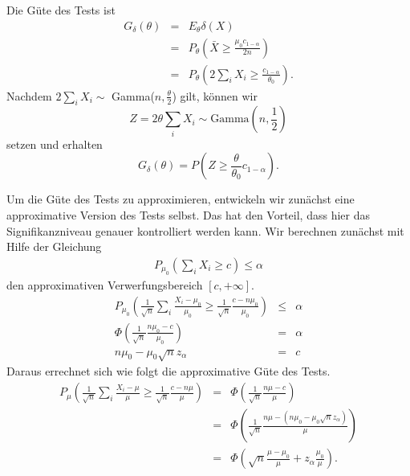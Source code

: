 Die Güte des Tests ist
\begin{eqnarray*}
    G_\delta (\theta) &=&  E_\theta \delta(X) \\
    &=& P_\theta \left( \bar X  \geq \frac{\mu_0 c_{1-\alpha}}{2n} \right) \\
    &=& P_\theta \left( 2 \sum_{i}^{} X_i \geq \frac{c_{1-\alpha}}{\theta_0} \right).
\end{eqnarray*}
Nachdem $2 \sum_{i} X_i \sim $ Gamma($n, \frac{\theta}{2}$) gilt, können wir 
\begin{equation*}
    Z = 2 \theta \sum_{i}^{} X_i \sim \textrm{Gamma}(n,\frac{1}{2})
\end{equation*}
setzen und erhalten
\begin{equation*}
    G_\delta(\theta) = P \left( Z \geq \frac{\theta}{\theta_0} c_{1-\alpha} \right).
\end{equation*}

Um die Güte des Tests zu approximieren, entwickeln wir zunächst eine approximative 
Version des Tests selbst. Das hat den Vorteil, dass hier das Signifikanzniveau 
genauer kontrolliert werden kann. Wir berechnen zunächst mit Hilfe der Gleichung
\begin{eqnarray*}
    P_{\mu_0} \left( \sum_{i}^{} X_i \geq c \right) \leq \alpha
\end{eqnarray*}
den approximativen Verwerfungsbereich $\left[ c,+\infty \right]$.
\begin{eqnarray*}
    P_{\mu_0} \left( \frac{1}{\sqrt{n}} \sum_{i}^{} \frac{X_i - \mu_0}{\mu_0} \geq \frac{1}{\sqrt{n}} 
    \frac{c -n\mu_0}{ \mu_0}\right) &\leq& \alpha \\
    \Phi \left( \frac{1}{\sqrt{n} } \frac{n \mu_0 - c}{\mu_0}  \right) &=&  \alpha \\
    n \mu_0 - \mu_0 \sqrt{n} z_\alpha &=&  c
\end{eqnarray*}
Daraus errechnet sich wie folgt die approximative Güte des Tests.
\begin{eqnarray*}
    P_\mu \left( \frac{1}{\sqrt{n}} \sum_{i}^{} \frac{X_i - \mu}{\mu} \geq \frac{1}{\sqrt{n}} \frac{c-n \mu}{ \mu}   \right) &=&  \Phi \left( \frac{1}{\sqrt{n}} \frac{n \mu - c}{ \mu} \right) \\
    &=& \Phi \left( \frac{1}{\sqrt{n}} \frac{n \mu - \left( n \mu_0 -\mu_0 \sqrt{n} z_\alpha \right)}{\mu} \right) \\
    &=& \Phi \left( \sqrt{n} \frac{\mu - \mu_0}{\mu} + z_\alpha \frac{\mu_0}{\mu} \right).
\end{eqnarray*}

